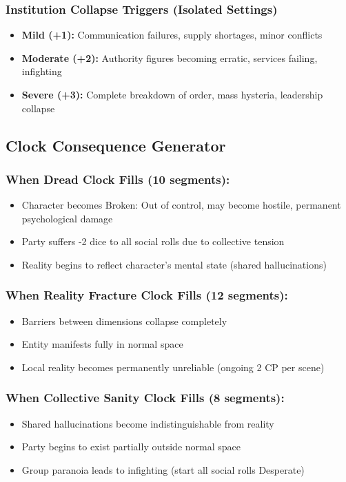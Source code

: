 \documentclass[11pt]{article}
\begin{document}
\subsubsection{Institution Collapse Triggers (Isolated Settings)}
\begin{itemize}
\item \textbf{Mild (+1):} Communication failures, supply shortages, minor conflicts
\item \textbf{Moderate (+2):} Authority figures becoming erratic, services failing, infighting
\item \textbf{Severe (+3):} Complete breakdown of order, mass hysteria, leadership collapse
\end{itemize}

\subsection{Clock Consequence Generator}

\subsubsection{When Dread Clock Fills (10 segments):}
\begin{itemize}
\item Character becomes Broken: Out of control, may become hostile, permanent psychological damage
\item Party suffers -2 dice to all social rolls due to collective tension
\item Reality begins to reflect character's mental state (shared hallucinations)
\end{itemize}

\subsubsection{When Reality Fracture Clock Fills (12 segments):}
\begin{itemize}
\item Barriers between dimensions collapse completely
\item Entity manifests fully in normal space
\item Local reality becomes permanently unreliable (ongoing 2 CP per scene)
\end{itemize}

\subsubsection{When Collective Sanity Clock Fills (8 segments):}
\begin{itemize}
\item Shared hallucinations become indistinguishable from reality
\item Party begins to exist partially outside normal space
\item Group paranoia leads to infighting (start all social rolls Desperate)
\end{itemize}
\end{document}
